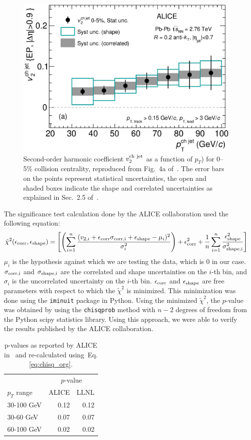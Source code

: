 \documentclass[11pt]{article}
\begin{document}
    \begin{figure}[h]
\begin{center}
        \includegraphics[width=.5\textwidth]{figures/data}
        \caption{Second-order harmonic coefficient $v_2^{\rm ch\ jet}$ as a function of $p_T$) for 0--5\% collision centrality, reproduced from Fig.~4a of~\cite{Adam:2016ix}.  The error bars on the points represent statistical uncertainties, the open and shaded boxes indicate the shape and correlated uncertainties as explained in Sec.~2.5 of~\cite{Adam:2016ix}.}
        \label{fig:data}
\end{center}
    \end{figure}

The significance test calculation done by the ALICE collaboration used the following equation:
\begin{equation}\label{eq:chisq_org}
    \tilde{\chi}^2 (\epsilon_{\rm corr}, \epsilon_{\rm shape}) = \left[ \left( \sum_{i=1}^{n} \frac{(v_{2, i} + \epsilon_{\rm corr} \sigma_{\rm corr, i} + \epsilon_{\rm shape} - \mu_i)^2}{\sigma^2_i} \right)+ \epsilon_{\rm corr}^2 +  \frac{1}{n}\sum_{i=1}^{n} \frac{\epsilon_{\rm shape}^2}{\sigma^2_{\rm shape, i}}   \right]
\end{equation}
$\mu_i$ is the hypothesis against which we are testing the data, which is 0 in our case. $\sigma_{\rm corr, i}$ and $\sigma_{\rm shape, i}$ are the correlated and shape uncertainties on the $i$-th bin, and $\sigma_i$ is the uncorrelated uncertainty on the $i$-th bin. $\epsilon_{\rm corr}$ and $\epsilon_{\rm shape}$ are free parameters with respect to which the $\tilde{\chi}^2$ is minimized. This minimization was done using the \texttt{iminuit} package in Python. Using the minimized $\tilde{\chi}^2$, the $p$-value was obtained by using the \texttt{chisqprob} method with $n - 2$ degrees of freedom from the Python scipy statistics library. Using this approach, we were able to verify the results published by the ALICE collaboration.

\begin{table}[h]
\begin{center}
\begin{tabular}{ l r r }
  & \multicolumn{2}{c}{$p$-value} \\
$p_T$ range & ALICE & LLNL \\
\hline
30-100 GeV & 0.12 & 0.12 \\ 
30-60 GeV & 0.07 & 0.07 \\ 
60-100 GeV & 0.02 & 0.02 \\
\end{tabular}
\caption{p-values as reported by ALICE in~\cite{Adam:2016ix} and re-calculated using~Eq.\ref{eq:chisq_org}.}
\end{center}
\end{table}
\end{document}
